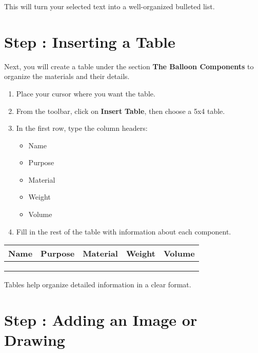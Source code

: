 \documentclass{article}
\begin{document}
This will turn your selected text into a well-organized bulleted list.

\section{Step : Inserting a Table}

Next, you will create a table under the section \textbf{The Balloon Components} to organize the materials and their details.

\begin{tcolorbox}[colback=green!10!white, colframe=green!75!black, title=Instructions]
\begin{enumerate} 
  \item Place your cursor where you want the table.  
  \item From the toolbar, click on \textbf{Insert} \> \textbf{Table}, then choose a 5x4 table.  
  \item In the first row, type the column headers:  
  \begin{itemize}
    \item Name  
    \item Purpose  
    \item Material  
    \item Weight  
    \item Volume  
  \end{itemize}
  \item Fill in the rest of the table with information about each component. 
\end{enumerate}  
\end{tcolorbox}

\begin{tabularx}{\linewidth}{|X|X|X|X|X|}
  \hline
  \textbf{Name} & \textbf{Purpose} & \textbf{Material} & \textbf{Weight} & \textbf{Volume} \\
  \hline
  & & & & \\
  & & & & \\
  & & & & \\
  \hline
\end{tabularx}

\vspace{1em}
Tables help organize detailed information in a clear format.

\section{Step : Adding an Image or Drawing}
\end{document}
